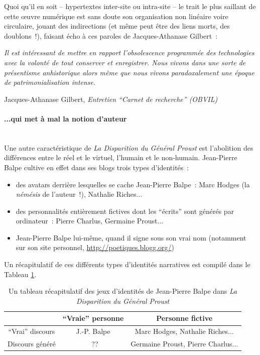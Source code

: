 \documentclass{article}
\newcommand{\subsubsubsection}[1]{\paragraph{#1}\mbox{}\\}
\newenvironment{citationbox}
{\begin{center}
		\begin{minipage}{.8\textwidth}
		}
		{
		\end{minipage}	
\end{center}
}
\begin{document}
					Quoi qu'il en soit -- hypertextes inter-site ou intra-site -- le trait le plus saillant de cette œuvre numérique est sans doute son organisation non linéaire voire circulaire, jouant des indirections (et même peut être des liens morts, des doublons~!), faisant écho à ces paroles de Jacques-Athanase Gilbert~:
					\begin{citationbox}
						\textit{Il est intéressant de mettre en rapport l’obsolescence programmée des technologies avec la volonté de tout conserver et enregistrer. Nous vivons dans une sorte de présentisme anhistorique alors même que nous vivons paradoxalement une époque de patrimonialisation intense.}
						\begin{flushright}
							Jacques-Athanase Gilbert, \textit{Entretien ``Carnet de recherche'' (OBVIL)} \cite{gilbert2018}
						\end{flushright}
					\end{citationbox}
				\subsubsubsection{...qui met à mal la notion d'auteur}
					Une autre caractéristique de \textit{La Disparition du Général Proust} est l'abolition des différences entre le réel et le virtuel, l'humain et le non-humain. Jean-Pierre Balpe cultive en effet dans ses blogs trois types d'identités~:
					\begin{itemize}
						\item des avatars derrière lesquelles se cache Jean-Pierre Balpe : Marc Hodges (la \textit{némésis} de l'auteur~!), Nathalie Riches...
						\item des personnalités entièrement fictives dont les ``écrits'' sont générés par ordinateur : Pierre Charlus, Germaine Proust...
						\item Jean-Pierre Balpe lui-même, quand il signe sous son vrai nom (notamment sur son site personnel, \href{http://poetiques.blogg.org/}{http://poetiques.blogg.org/})
					\end{itemize}
					Un récapitulatif de ces différents types d'identités narratives est compilé dans le Tableau \ref{tab:balpe_identites}.
					\begin{table}
						\centering
						\begin{tabular}{c | c c}
							&``Vraie'' personne & Personne fictive \\ \hline
							``Vrai'' discours & J.-P. Balpe & Marc Hodges, Nathalie Riches...\\
							Discours généré &~?? & Germaine Proust, Pierre Charlus...
						\end{tabular}
						\caption{Un tableau récapitulatif des jeux d'identités de Jean-Pierre Balpe dans \textit{La Disparition du Général Proust}}
						\label{tab:balpe_identites}
					\end{table}
\end{document}

